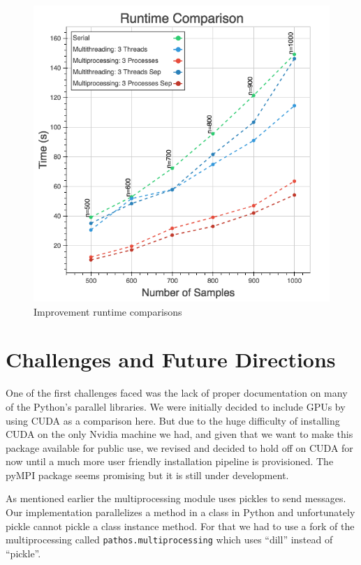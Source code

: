 \documentclass[10pt,twocolumn,letterpaper]{article}
\begin{document}
\begin{figure}[htbp] 
\begin{center}
\includegraphics[scale=0.65]{figure/Ultimate_comparison.png}
\end{center}
\caption{\label{fig:Improvement-runtime-comparisons}Improvement runtime comparisons}

\end{figure}

\section{Challenges and Future Directions} \label{challenges}

One of the first challenges faced was the lack of proper documentation
on many of the Python's parallel libraries. We were initially decided
to include GPUs by using CUDA as a comparison here. But due to the
huge difficulty of installing CUDA on the only Nvidia machine we had,
and given that we want to make this package available for public use,
we revised and decided to hold off on CUDA for now until a much more
user friendly installation pipeline is provisioned. The pyMPI package
seems promising but it is still under development.

As mentioned earlier the multiprocessing module uses pickles to send
messages. Our implementation parallelizes a method in a class in Python
and unfortunately pickle cannot pickle a class instance method. For
that we had to use a fork of the multiprocessing called \texttt{pathos.multiprocessing}
which uses ``dill'' instead of ``pickle''. 
\end{document}
